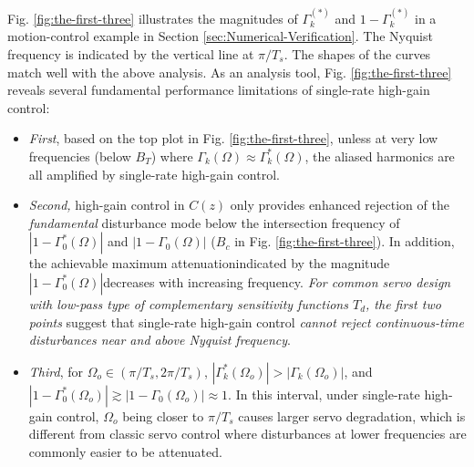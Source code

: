 \documentclass [11pt, proquest] {uwthesis}[2020/02/24]
\begin{document}
Fig. \ref{fig:the-first-three} illustrates the magnitudes of $\Gamma_{k}^{(*)}$
and $1-\Gamma_{k}^{(*)}$ in a motion-control example in Section \ref{sec:Numerical-Verification}.
The Nyquist frequency is indicated by the vertical line at $\pi/T_{s}$.
The shapes of the curves match well with the above analysis. As an
analysis tool, Fig. \ref{fig:the-first-three} reveals several fundamental
performance limitations of single-rate high-gain control:
\begin{itemize}
\item \emph{First}, based on the top plot in Fig. \ref{fig:the-first-three},
unless at very low frequencies (below $B_{T}$) where $\Gamma_{k}(\Omega)\approx\Gamma_{k}^{*}(\Omega)$,
the aliased harmonics are all amplified by single-rate high-gain control.
\item \textit{Second}\textit{\emph{, }}high-gain control in $C(z)$ only
provides enhanced rejection of the \emph{fundamental} disturbance
mode below the intersection frequency of $|1-\Gamma_{0}^{*}(\Omega)|$
and $|1-\Gamma_{0}(\Omega)|$ ($B_{c}$ in Fig. \ref{fig:the-first-three}).
In addition, the achievable maximum attenuation\textemdash indicated
by the magnitude $|1-\Gamma_{0}^{*}(\Omega)|$\textemdash decreases
with increasing frequency. \textit{\emph{For common servo design with
low-pass type of complementary sensitivity functions $T_{d}$, the
first two points }}suggest that single-rate high-gain control\emph{
cannot reject continuous-time disturbances near and above Nyquist
frequency}.
\item \emph{Third}, for $\Omega_{o}\in(\pi/T_{s},2\pi/T_{s})$, $|\Gamma_{k}^{*}(\Omega_{o})|>|\Gamma_{k}(\Omega_{o})|$,
and $|1-\Gamma_{0}^{*}(\Omega_{o})|\gtrsim|1-\Gamma_{0}(\Omega_{o})|\approx1$.
In this interval, under single-rate high-gain control, $\Omega_{o}$
being closer to $\pi/T_{s}$ causes larger servo degradation, which
is different from classic servo control where disturbances at lower
frequencies are commonly easier to be attenuated.
\begin{figure}[!ht]
\begin{centering}

\end{centering}
\end{figure}
\end{itemize}
\end{document}

